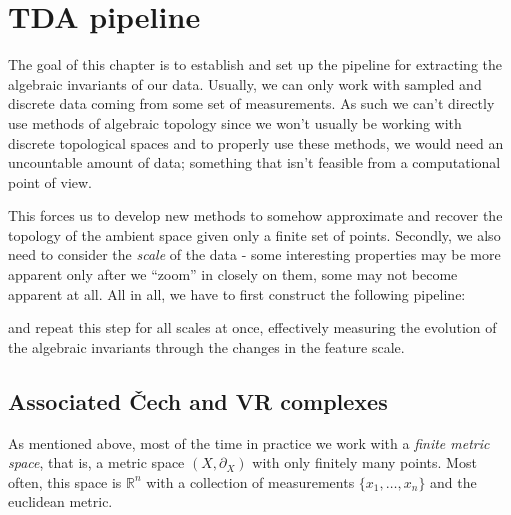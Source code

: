 \chapter{TDA pipeline}
\graphicspath{ {/home/tomasp/Dokumenty/Master_Thesis/figures/} }

The goal of this chapter is to establish and set up the pipeline for extracting the algebraic invariants of our data. Usually, we can only work with sampled and discrete data coming from some set of measurements. As such we can't directly use methods of algebraic topology since we won't usually be working with discrete topological spaces and to properly use these methods, we would need an uncountable amount of data; something that isn't feasible from a computational point of view.
\par
This forces us to develop new methods to somehow approximate and recover the topology of the ambient space given only a finite set of points. Secondly, we also need to consider the \textit{scale} of the data - some interesting properties may be more apparent only after we ``zoom'' in closely on them, some may not become apparent at all. All in all, we have to first construct the following pipeline:

\begin{center}
\end{center}

and repeat this step for all scales at once, effectively measuring the evolution of the algebraic invariants through the changes in the feature scale.

\section{Associated Čech and VR complexes}
As mentioned above, most of the time in practice we work with a \textit{finite metric space}, that is, a metric space $(X, \partial_{X})$ with only finitely many points. Most often, this space is $\mathbb{R}^{n}$ with a collection of measurements $\{x_{1}, \ldots, x_{n}\}$ and the euclidean metric.
